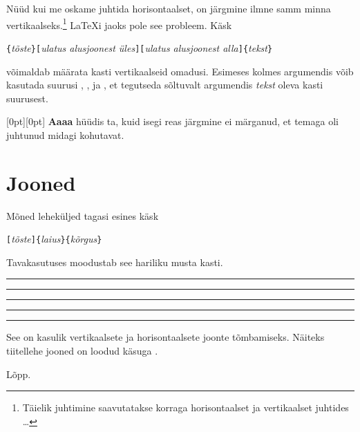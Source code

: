 Nüüd kui me oskame juhtida horisontaalset, on järgmine ilmne samm minna
vertikaalseks.\footnote{Täielik juhtimine saavutatakse korraga
horisontaalset ja vertikaalset juhtides \ldots} \LaTeX i jaoks pole
see probleem. Käsk

\begin{lscommand}
\verb|{|\emph{tõste}\verb|}[|\emph{ulatus alusjoonest
üles}\verb|][|\emph{ulatus alusjoonest
alla}\verb|]{|\emph{tekst}\verb|}|
\end{lscommand}
\noindent võimaldab määrata kasti vertikaalseid omadusi. Esimeses kolmes
argumendis võib kasutada suurusi , ,  ja
, et tegutseda sõltuvalt argumendis \emph{tekst} oleva
kasti suurusest.

\begin{example}
\raisebox{0pt}[0pt][0pt]{\Large%
\textbf{Aaaa\raisebox{-0.3ex}{a}%
\raisebox{-0.7ex}{aa}%
\raisebox{-1.2ex}{pp}%
\raisebox{-2.2ex}{i}%
\raisebox{-4.5ex}{i}}}
hüüdis ta, kuid isegi reas
järgmine ei märganud, et temaga
oli juhtunud midagi kohutavat.
\end{example}

\section{Jooned}
\label{sec:rule}

Mõned leheküljed tagasi esines käsk

\begin{lscommand}
\verb|[|\emph{tõste}\verb|]{|\emph{laius}\verb|}{|\emph{kõrgus}\verb|}|
\end{lscommand}

\noindent Tavakasutuses moodustab see hariliku musta kasti.

\begin{example}
\rule{3mm}{.1pt}%
\rule[-1mm]{5mm}{1cm}%
\rule{3mm}{.1pt}%
\rule[1mm]{1cm}{5mm}%
\rule{3mm}{.1pt}
\end{example}

\noindent See on kasulik vertikaalsete ja horisontaalsete joonte
tõmbamiseks. Näiteks tiitellehe jooned on loodud käsuga .

\bigskip
{\flushright Lõpp.\par}

%

